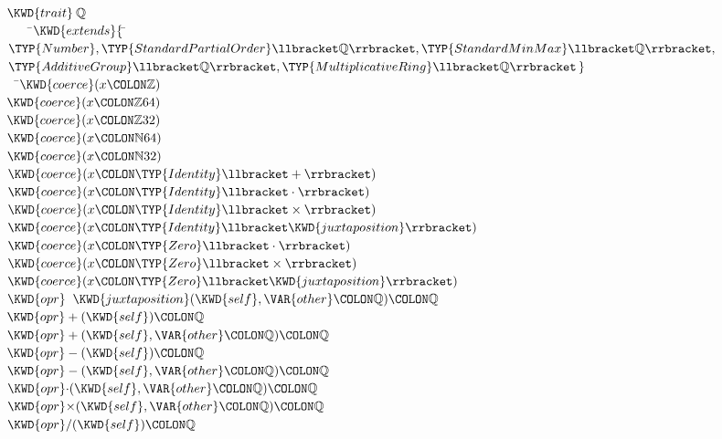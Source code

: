 \begin{Fortress}
\(\KWD{trait}\:\mathbb{Q}\)\\
{\tt~~~~}\pushtabs\=\+\(    \KWD{extends} \{\, \null\)\pushtabs\=\+\(\TYP{Number}, \TYP{StandardPartialOrder}\llbracket\mathbb{Q}\rrbracket, \TYP{StandardMinMax}\llbracket\mathbb{Q}\rrbracket,\)\\
\(              \TYP{AdditiveGroup}\llbracket\mathbb{Q}\rrbracket, \TYP{MultiplicativeRing}\llbracket\mathbb{Q}\rrbracket\,\}\)\-\-\\\poptabs\poptabs
{\tt~~}\pushtabs\=\+\(  \KWD{coerce}(x\COLON \mathbb{Z})\)\\
\(  \KWD{coerce}(x\COLON \mathbb{Z}64)\)\\
\(  \KWD{coerce}(x\COLON \mathbb{Z}32)\)\\
\(  \KWD{coerce}(x\COLON \mathbb{N}64)\)\\
\(  \KWD{coerce}(x\COLON \mathbb{N}32)\)\\
\(  \KWD{coerce}(x\COLON \TYP{Identity}\llbracket+\rrbracket)\)\\
\(  \KWD{coerce}(x\COLON \TYP{Identity}\llbracket\cdot\rrbracket)\)\\
\(  \KWD{coerce}(x\COLON \TYP{Identity}\llbracket\times\rrbracket)\)\\
\(  \KWD{coerce}(x\COLON \TYP{Identity}\llbracket\KWD{juxtaposition}\rrbracket)\)\\
\(  \KWD{coerce}(x\COLON \TYP{Zero}\llbracket\cdot\rrbracket)\)\\
\(  \KWD{coerce}(x\COLON \TYP{Zero}\llbracket\times\rrbracket)\)\\
\(  \KWD{coerce}(x\COLON \TYP{Zero}\llbracket\KWD{juxtaposition}\rrbracket)\)\\
\(  \KWD{opr}\;\;\KWD{juxtaposition}(\KWD{self}, \VAR{other}\COLON \mathbb{Q})\COLON \mathbb{Q}\)\\
\(  \KWD{opr} +(\KWD{self})\COLON \mathbb{Q}\)\\
\(  \KWD{opr} +(\KWD{self}, \VAR{other}\COLON \mathbb{Q})\COLON \mathbb{Q}\)\\
\(  \KWD{opr} -(\KWD{self})\COLON \mathbb{Q}\)\\
\(  \KWD{opr} -(\KWD{self}, \VAR{other}\COLON \mathbb{Q})\COLON \mathbb{Q}\)\\
\(  \KWD{opr} \mathord{\cdot}(\KWD{self}, \VAR{other}\COLON \mathbb{Q})\COLON \mathbb{Q}\)\\
\(  \KWD{opr} \mathord{\times}(\KWD{self}, \VAR{other}\COLON \mathbb{Q})\COLON \mathbb{Q}\)\\
\(  \KWD{opr} /(\KWD{self})\COLON \mathbb{Q}\)\\

\end{Fortress}
